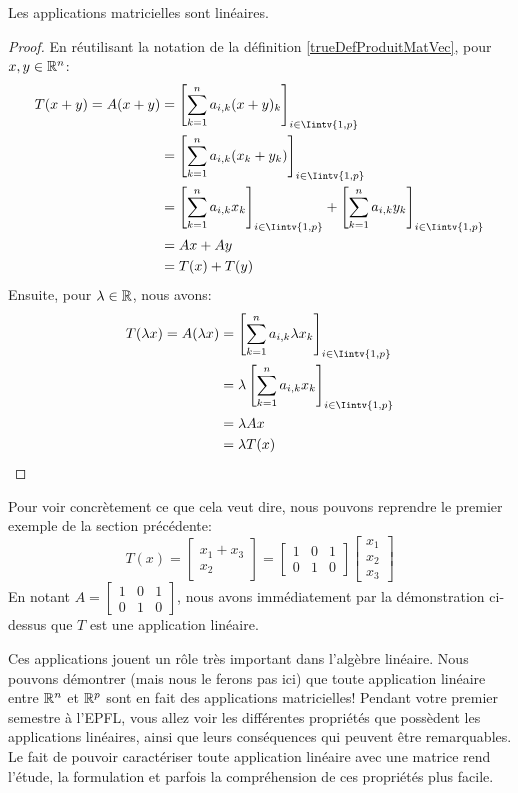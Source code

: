\begin{boxlemma}
Les applications matricielles sont linéaires.
\end{boxlemma}
\begin{proof}
En réutilisant la notation de la définition \ref{trueDefProduitMatVec}, pour $x,y \in \mathbb{R}^n$:
\begin{align*}
    T(x+y) = A(x+y) &= \left[\sum_{k = 1}^n a_{i,k}(x+y)_k\right]_{i \in \Iintv{1,p}} \\ 
    &= \left[\sum_{k = 1}^n a_{i,k}(x_k + y_k)\right]_{i \in \Iintv{1,p}} \\
    &= \left[\sum_{k = 1}^n a_{i,k}x_k\right]_{i \in \Iintv{1,p}} + \left[\sum_{k = 1}^n a_{i,k}y_k\right]_{i \in \Iintv{1,p}} \\
    &= Ax + Ay \\
    &= T(x) + T(y)
\end{align*}
Ensuite, pour $\lambda \in \mathbb{R}$, nous avons:
\begin{align*}
    T(\lambda x) = A(\lambda x) &= \left[\sum_{k = 1}^n a_{i,k}\lambda x_k\right]_{i \in \Iintv{1,p}} \\
    &= \lambda \left[\sum_{k = 1}^n a_{i,k}x_k\right]_{i \in \Iintv{1,p}} \\
    &= \lambda Ax \\
    &= \lambda T(x)
\end{align*}
\end{proof}

Pour voir concrètement ce que cela veut dire, nous pouvons reprendre le premier exemple de la section précédente:
$$T(x) = 
\begin{bmatrix}
x_1 + x_3 \\ x_2
\end{bmatrix} = \begin{bmatrix}
1 & 0 & 1 \\ 0 & 1 & 0
\end{bmatrix} \begin{bmatrix}
x_1 \\ x_2 \\ x_3 \end{bmatrix}$$
En notant $A = \begin{bmatrix}
1 & 0 & 1 \\ 0 & 1 & 0
\end{bmatrix}$, nous avons immédiatement par la démonstration ci-dessus que $T$ est une application linéaire.

Ces applications jouent un rôle très important dans l'algèbre linéaire. Nous pouvons démontrer (mais nous le ferons pas ici) que toute application linéaire entre $\mathbb{R}^n$ et $\mathbb{R}^p$ sont en fait des applications matricielles! Pendant votre premier semestre à l'EPFL, vous allez voir les différentes propriétés que possèdent les applications linéaires, ainsi que leurs conséquences qui peuvent être remarquables. Le fait de pouvoir caractériser toute application linéaire avec une matrice rend l'étude, la formulation et parfois la compréhension de ces propriétés plus facile. 

